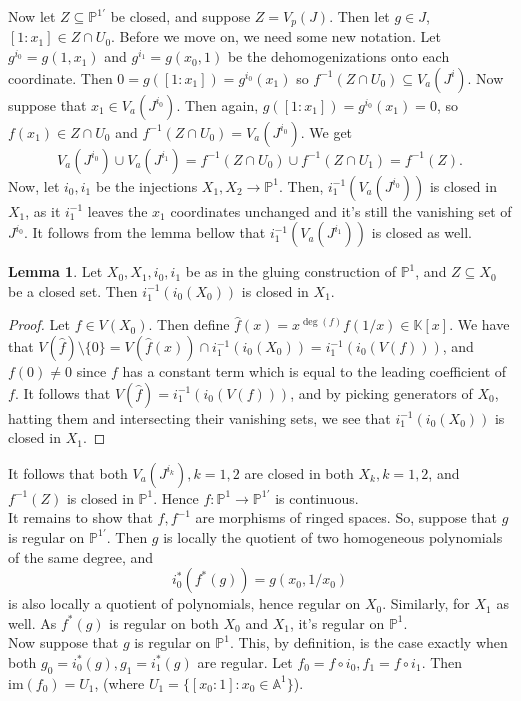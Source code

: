 \documentclass{article}
\theoremstyle{definition}
\newtheorem{lemma}[theorem]{Lemma}
\newcommand{\K}{\mathbb{K}}
\renewcommand{\P}{\mathbb{P}}
\newcommand{\A}{\mathbb{A}}
\renewcommand{\AA}[1]{\A^{#1}}
\newcommand{\PP}[1]{\P^{#1}}
\newcommand{\im}{\text{im}}
\begin{document}
Now let $Z \subseteq \PP{1'}$ be closed, and suppose $Z = V_p(J)$. Then let $g
\in J$, $[1 : x_1] \in Z \cap U_0$. Before we move on, we need some new
notation. Let $g^{i_0} = g(1, x_1)$ and $g^{i_1} = g(x_0, 1)$ be the
dehomogenizations onto each coordinate. Then $0 = g([1:x_1]) = g^{i_0}(x_1)$ so
$f^{-1}(Z \cap U_0) \subseteq V_a(J^{i})$. Now suppose that $x_1 \in
V_a(J^{i_0})$. Then again, $g([1:x_1]) = g^{i_0}(x_1) = 0$, so $f(x_1) \in Z
\cap U_0$ and $f^{-1}(Z \cap U_0) = V_a(J^{i_0})$. We get
\[
	V_a(J^{i_0}) \cup V_a(J^{i_1}) = f^{-1}(Z \cap U_0) \cup f^{-1}(Z \cap U_1) = f^{-1}(Z).
\]
Now, let $i_0, i_1$ be the injections $X_1, X_2 \to \PP{1}$. Then,
$i_1^{-1}(V_a(J^{i_0}))$ is closed in $X_1$, as it $i_1^{-1}$ leaves the $x_1$
coordinates unchanged and it's still the vanishing set of $J^{i_0}$. It follows
from the lemma bellow that $i_1^{-1}(V_a(J^{i_1}))$ is closed as well.

\begin{lemma}
	Let $X_0, X_1, i_0, i_1$ be as in the gluing construction of $\PP{1}$, and
	$Z \subseteq X_0$ be a closed set. Then $i_1^{-1}(i_0(X_0))$ is closed in
	$X_1$.
\end{lemma}
\begin{proof}
	Let $f \in V(X_0)$. Then define $\hat{f}(x) = x^{\deg(f)}f(1/x) \in \K[x]$.
	We have that $V(\hat{f}) \setminus \{0\} = V(\hat{f}(x)) \cap
	i_1^{-1}(i_0(X_0)) = i_1^{-1}(i_0(V(f)))$, and $f(0) \not = 0$ since $f$
	has a constant term which is equal to the leading coefficient of $f$. It
	follows that $V(\hat{f}) = i_1^{-1}(i_0(V(f)))$, and by picking generators
	of $X_0$, hatting them and intersecting their vanishing sets, we see that
	$i_1^{-1}(i_0(X_0))$ is closed in $X_1$.
\end{proof}

It follows that both $V_a(J^{i_k}), k=1,2$ are closed in both $X_k, k=1,2$, and
$f^{-1}(Z)$ is closed in $\PP{1}$. Hence $f : \PP{1} \to \PP{1'}$ is continuous. \\

It remains to show that $f, f^{-1}$ are morphisms of ringed spaces. So,
suppose that $g$ is regular on $\PP{1'}$. Then $g$ is locally the quotient
of two homogeneous polynomials of the same degree, and 
\[
	i_0^*(f^*(g)) = g(x_0, 1/x_0)
\]
is also locally a quotient of polynomials, hence regular on $X_0$. Similarly,
for $X_1$ as well. As $f^*(g)$ is regular on both $X_0$ and $X_1$, it's regular
on $\PP{1}$. \\

Now suppose that $g$ is regular on $\PP{1}$. This, by definition, is the case
exactly when both $g_0 = i_0^*(g), g_1 = i_1^*(g)$ are regular. Let $f_0 = f
\circ i_0, f_1 = f \circ i_1$. Then $\im(f_0) = U_1$, (where $U_1 = \{[x_0 : 1]
: x_0 \in \AA{1}\}$). \\
\end{document}
